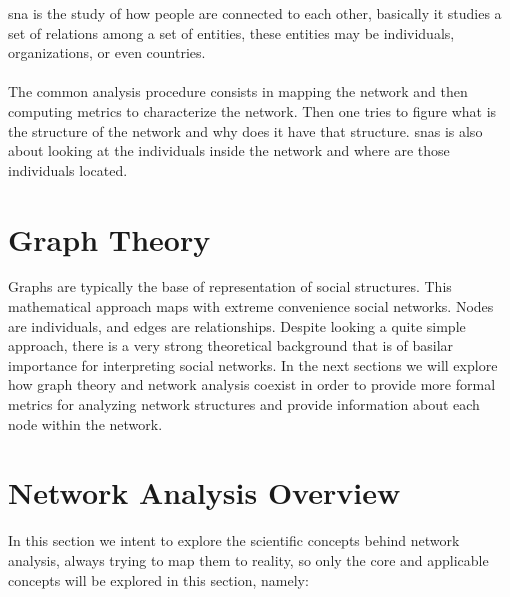 \acrfull{sna} is the study of how people are connected to each other, basically it studies a set of relations among a set of entities,
these entities may be individuals, organizations, or even countries.\\\\
\indent The common analysis procedure consists in mapping the network and then computing metrics to
characterize the network. Then one tries to figure what is the structure of the network and why does
it have that structure. \glspl{sna} is also about looking at the individuals inside the network and where are those individuals located.

\section{Graph Theory}
Graphs are typically the base of representation of social structures. This mathematical approach maps with  extreme convenience social networks. Nodes are individuals, and edges are relationships. Despite looking a quite simple approach, there is a very strong theoretical background that is of basilar importance for interpreting social networks. In the next sections we will explore how graph theory and network analysis coexist in order to provide more formal metrics for analyzing network structures and provide information about each node within the network.

\section{Network Analysis Overview}
In this section we intent to explore the scientific concepts behind network analysis, always trying to map them to reality, so only the core and applicable concepts will be explored in this section, namely:

